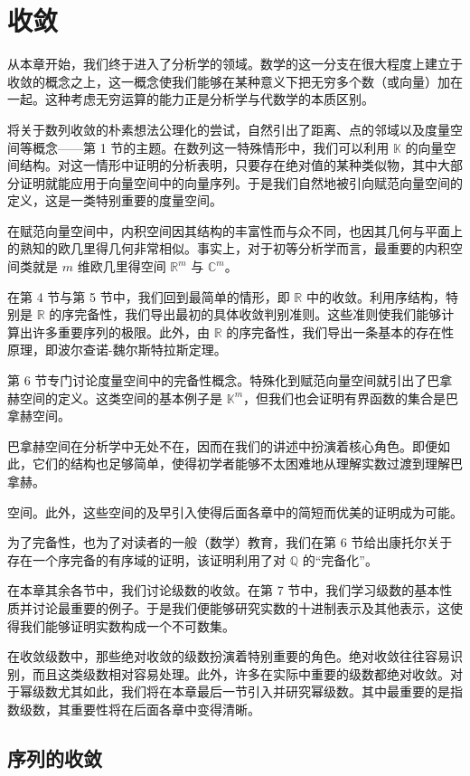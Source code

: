 \chapter{收敛}
从本章开始，我们终于进入了分析学的领域。数学的这一分支在很大程度上建立于收敛的概念之上，这一概念使我们能够在某种意义下把无穷多个数（或向量）加在一起。这种考虑无穷运算的能力正是分析学与代数学的本质区别。

将关于数列收敛的朴素想法公理化的尝试，自然引出了距离、点的邻域以及度量空间等概念——第 1 节的主题。在数列这一特殊情形中，我们可以利用 $ \mathbb{K} $ 的向量空间结构。对这一情形中证明的分析表明，只要存在绝对值的某种类似物，其中大部分证明就能应用于向量空间中的向量序列。于是我们自然地被引向赋范向量空间的定义，这是一类特别重要的度量空间。

在赋范向量空间中，内积空间因其结构的丰富性而与众不同，也因其几何与平面上的熟知的欧几里得几何非常相似。事实上，对于初等分析学而言，最重要的内积空间类就是 $m$ 维欧几里得空间 $\mathbb{R}^m$ 与 $\mathbb{C}^m$。

在第 4 节与第 5 节中，我们回到最简单的情形，即 $ \mathbb{R} $ 中的收敛。利用序结构，特别是 $ \mathbb{R} $ 的序完备性，我们导出最初的具体收敛判别准则。这些准则使我们能够计算出许多重要序列的极限。此外，由 $ \mathbb{R} $ 的序完备性，我们导出一条基本的存在性原理，即波尔查诺-魏尔斯特拉斯定理。

第 6 节专门讨论度量空间中的完备性概念。特殊化到赋范向量空间就引出了巴拿赫空间的定义。这类空间的基本例子是 $ \mathbb{K}^m $，但我们也会证明有界函数的集合是巴拿赫空间。

巴拿赫空间在分析学中无处不在，因而在我们的讲述中扮演着核心角色。即便如此，它们的结构也足够简单，使得初学者能够不太困难地从理解实数过渡到理解巴拿赫。

空间。此外，这些空间的及早引入使得后面各章中的简短而优美的证明成为可能。

为了完备性，也为了对读者的一般（数学）教育，我们在第 6 节给出康托尔关于存在一个序完备的有序域的证明，该证明利用了对 $ \mathbb{Q} $ 的“完备化”。

在本章其余各节中，我们讨论级数的收敛。在第 7 节中，我们学习级数的基本性质并讨论最重要的例子。于是我们便能够研究实数的十进制表示及其他表示，这使得我们能够证明实数构成一个不可数集。

在收敛级数中，那些绝对收敛的级数扮演着特别重要的角色。绝对收敛往往容易识别，而且这类级数相对容易处理。此外，许多在实际中重要的级数都绝对收敛。对于幂级数尤其如此，我们将在本章最后一节引入并研究幂级数。其中最重要的是指数级数，其重要性将在后面各章中变得清晰。

\section{序列的收敛}


